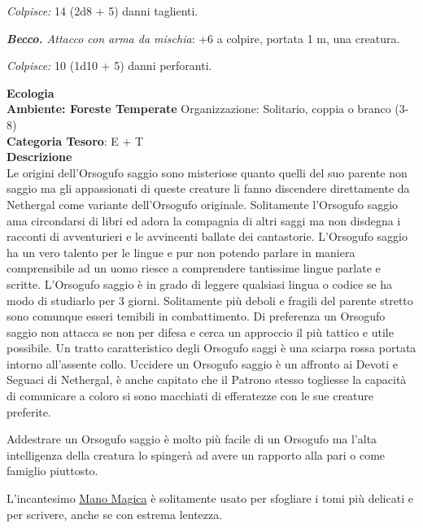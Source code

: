 \begin{multicols}{2}
{\emph{Colpisce:} 14 (2d8 + 5) danni taglienti.

\emph{\textbf{Becco.} Attacco con arma da mischia}: +6 a colpire, portata 1 m, una creatura.

\emph{Colpisce:} 10 (1d10 + 5) danni perforanti.

\textbf{Ecologia}\\
\textbf{Ambiente: Foreste Temperate}
Organizzazione: Solitario, coppia o branco (3-8)\\
\textbf{Categoria Tesoro}: E + T\\
\textbf{Descrizione}\\
Le origini dell'Orsogufo saggio sono misteriose quanto quelli del suo parente non saggio ma gli appassionati di queste creature li fanno discendere direttamente da Nethergal come variante dell'Orsogufo originale.
Solitamente l'Orsogufo saggio ama circondarsi di libri ed adora la compagnia di altri saggi ma non disdegna i racconti di avventurieri e le avvincenti ballate dei cantastorie. L'Orsogufo saggio ha un vero talento per le lingue e pur non potendo parlare in maniera comprensibile ad un uomo riesce a comprendere tantissime lingue parlate e scritte. L'Orsogufo saggio è in grado di leggere qualsiasi lingua o codice se ha modo di studiarlo per 3 giorni.
Solitamente più deboli e fragili del parente stretto sono comunque esseri temibili in combattimento.
Di preferenza un Orsogufo saggio non attacca se non per difesa e cerca un approccio il più tattico e utile possibile. Un tratto caratteristico degli Orsogufo saggi è una sciarpa rossa portata intorno all'assente collo. Uccidere un Orsogufo saggio è un affronto ai Devoti e Seguaci di Nethergal, è anche capitato che il Patrono stesso togliesse la capacità di comunicare a coloro si sono macchiati di efferatezze con le sue creature preferite.

Addestrare un Orsogufo saggio è molto più facile di un Orsogufo ma l'alta intelligenza della creatura lo spingerà ad avere un rapporto alla pari o come famiglio piuttosto.

L'incantesimo \hyperlink{Mano Magica}{Mano Magica} è solitamente usato per sfogliare i tomi più delicati e per scrivere, anche se con estrema lentezza.

}
\end{multicols}
